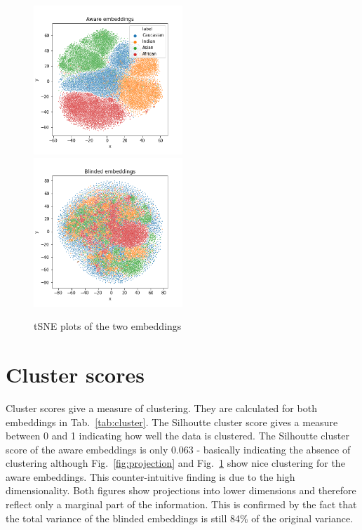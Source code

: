 \documentclass{report}
\begin{document}
\begin{figure}
  \includegraphics[width=0.5\textwidth]{t-SNE_aware.png}
  \includegraphics[width=0.5\textwidth]{t-SNE_blinded.png}
  \caption{tSNE plots of the two embeddings}
  \label{fig:tSNE}
\end{figure}


\section{Cluster scores}

Cluster scores give a measure of clustering. They are calculated for both embeddings in Tab.~\ref{tab:cluster}. The Silhoutte cluster score gives a measure between 0 and 1 indicating how well the data is clustered. The Silhoutte cluster score of the aware embeddings is only 0.063 -  basically indicating the absence of clustering although Fig.~\ref{fig:projection} and Fig.~\ref{fig:tSNE} show nice clustering for the aware embeddings. This counter-intuitive finding is due to the high dimensionality. Both figures show projections into lower dimensions and therefore reflect only a marginal part of the information. This is confirmed by the fact that the total variance of the blinded embeddings is still 84\% of the original variance.   
\end{document}

